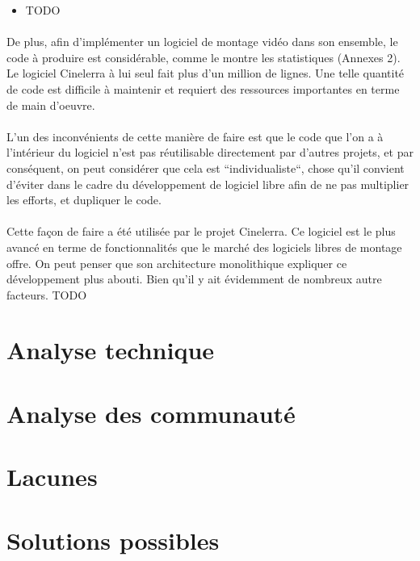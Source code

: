 \begin{itemize}
  \item{TODO}
\end{itemize}

\paragraph{} De plus, afin d'implémenter un logiciel de montage vidéo
dans son ensemble, le code à produire est considérable, comme
le montre les statistiques (Annexes 2). Le logiciel Cinelerra à lui
seul fait plus d'un million de lignes. Une telle quantité de code est
difficile à maintenir et requiert des ressources importantes en terme
de main d'oeuvre.

\paragraph{} L'un des inconvénients de cette manière de faire est que
le code que l'on a à l'intérieur du logiciel n'est pas réutilisable
directement par d'autres projets, et par conséquent, on peut considérer
que cela est ``individualiste``, chose qu'il convient d'éviter dans le
cadre du développement de logiciel libre afin de ne pas multiplier les
efforts, et dupliquer le code.

\paragraph{} Cette façon de faire a été utilisée par le projet
Cinelerra. Ce logiciel est le plus avancé en terme de fonctionnalités
que le marché des logiciels libres de montage offre. On peut
penser que son architecture monolithique expliquer ce développement
plus abouti. Bien qu'il y ait évidemment de nombreux autre facteurs. TODO


\section{Analyse technique}

\section{Analyse des communauté}

\section{Lacunes}

\section{Solutions possibles}
